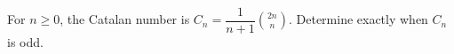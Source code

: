 For $n\ge0$, the Catalan number is $C_n=\dfrac{1}{n+1}\binom{2n}{n}$. Determine exactly when $C_n$ is odd.
